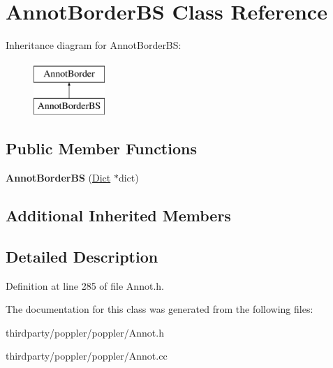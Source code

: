\hypertarget{class_annot_border_b_s}{}\section{Annot\+Border\+BS Class Reference}
\label{class_annot_border_b_s}
Inheritance diagram for Annot\+Border\+BS\+:\begin{figure}[H]
\begin{center}
\leavevmode
\includegraphics[height=2.000000cm]{class_annot_border_b_s}
\end{center}
\end{figure}
\subsection*{Public Member Functions}
\begin{DoxyCompactItemize}
\item 
\mbox{\label{class_annot_border_b_s_a4c9ca3eb7ef18b13d4ef01f09f9fa114}} 
{\bfseries Annot\+Border\+BS} (\hyperlink{class_dict}{Dict} $\ast$dict)
\end{DoxyCompactItemize}
\subsection*{Additional Inherited Members}


\subsection{Detailed Description}


Definition at line 285 of file Annot.\+h.



The documentation for this class was generated from the following files\+:\begin{DoxyCompactItemize}
\item 
thirdparty/poppler/poppler/Annot.\+h\item 
thirdparty/poppler/poppler/Annot.\+cc\end{DoxyCompactItemize}
